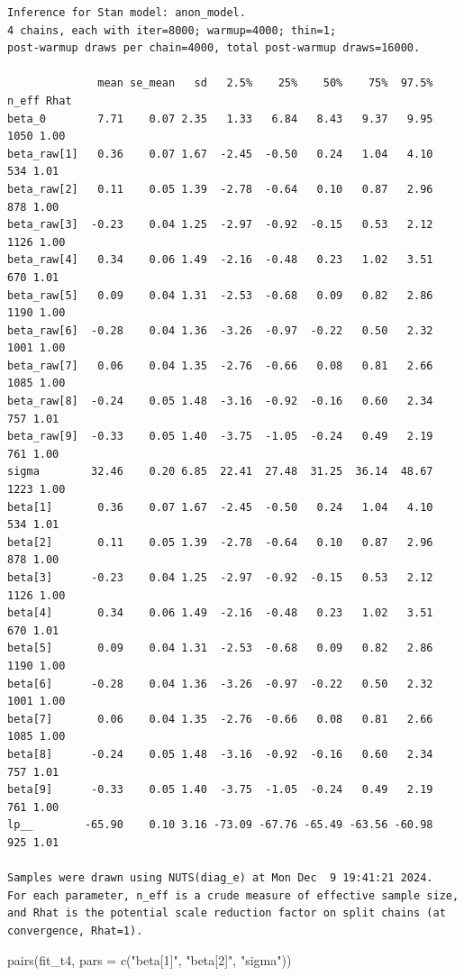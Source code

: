 \documentclass[
  10pt,
]{article}
\newenvironment{Shaded}{\begin{snugshade}}{\end{snugshade}}
\newcommand{\AttributeTok}[1]{\textcolor[rgb]{0.40,0.45,0.13}{#1}}
\newcommand{\FunctionTok}[1]{\textcolor[rgb]{0.28,0.35,0.67}{#1}}
\newcommand{\NormalTok}[1]{\textcolor[rgb]{0.00,0.23,0.31}{#1}}
\newcommand{\StringTok}[1]{\textcolor[rgb]{0.13,0.47,0.30}{#1}}
\begin{document}
\begin{verbatim}
Inference for Stan model: anon_model.
4 chains, each with iter=8000; warmup=4000; thin=1; 
post-warmup draws per chain=4000, total post-warmup draws=16000.

              mean se_mean   sd   2.5%    25%    50%    75%  97.5% n_eff Rhat
beta_0        7.71    0.07 2.35   1.33   6.84   8.43   9.37   9.95  1050 1.00
beta_raw[1]   0.36    0.07 1.67  -2.45  -0.50   0.24   1.04   4.10   534 1.01
beta_raw[2]   0.11    0.05 1.39  -2.78  -0.64   0.10   0.87   2.96   878 1.00
beta_raw[3]  -0.23    0.04 1.25  -2.97  -0.92  -0.15   0.53   2.12  1126 1.00
beta_raw[4]   0.34    0.06 1.49  -2.16  -0.48   0.23   1.02   3.51   670 1.01
beta_raw[5]   0.09    0.04 1.31  -2.53  -0.68   0.09   0.82   2.86  1190 1.00
beta_raw[6]  -0.28    0.04 1.36  -3.26  -0.97  -0.22   0.50   2.32  1001 1.00
beta_raw[7]   0.06    0.04 1.35  -2.76  -0.66   0.08   0.81   2.66  1085 1.00
beta_raw[8]  -0.24    0.05 1.48  -3.16  -0.92  -0.16   0.60   2.34   757 1.01
beta_raw[9]  -0.33    0.05 1.40  -3.75  -1.05  -0.24   0.49   2.19   761 1.00
sigma        32.46    0.20 6.85  22.41  27.48  31.25  36.14  48.67  1223 1.00
beta[1]       0.36    0.07 1.67  -2.45  -0.50   0.24   1.04   4.10   534 1.01
beta[2]       0.11    0.05 1.39  -2.78  -0.64   0.10   0.87   2.96   878 1.00
beta[3]      -0.23    0.04 1.25  -2.97  -0.92  -0.15   0.53   2.12  1126 1.00
beta[4]       0.34    0.06 1.49  -2.16  -0.48   0.23   1.02   3.51   670 1.01
beta[5]       0.09    0.04 1.31  -2.53  -0.68   0.09   0.82   2.86  1190 1.00
beta[6]      -0.28    0.04 1.36  -3.26  -0.97  -0.22   0.50   2.32  1001 1.00
beta[7]       0.06    0.04 1.35  -2.76  -0.66   0.08   0.81   2.66  1085 1.00
beta[8]      -0.24    0.05 1.48  -3.16  -0.92  -0.16   0.60   2.34   757 1.01
beta[9]      -0.33    0.05 1.40  -3.75  -1.05  -0.24   0.49   2.19   761 1.00
lp__        -65.90    0.10 3.16 -73.09 -67.76 -65.49 -63.56 -60.98   925 1.01

Samples were drawn using NUTS(diag_e) at Mon Dec  9 19:41:21 2024.
For each parameter, n_eff is a crude measure of effective sample size,
and Rhat is the potential scale reduction factor on split chains (at 
convergence, Rhat=1).
\end{verbatim}

\begin{Shaded}
\begin{Highlighting}[]
\FunctionTok{pairs}\NormalTok{(fit\_t4, }\AttributeTok{pars =} \FunctionTok{c}\NormalTok{(}\StringTok{"beta[1]"}\NormalTok{, }\StringTok{"beta[2]"}\NormalTok{, }\StringTok{"sigma"}\NormalTok{))}
\end{Highlighting}
\end{Shaded}
\end{document}
